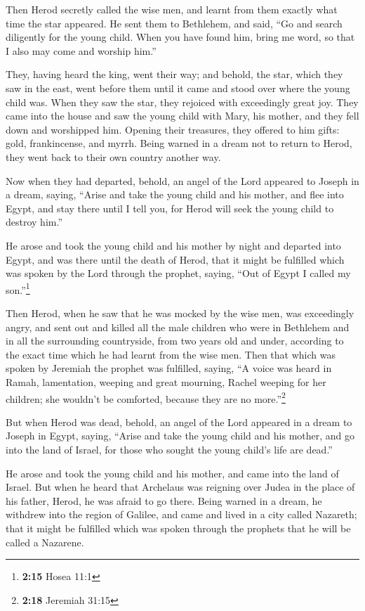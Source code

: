  Then Herod secretly called the wise men, and learnt from
them exactly what time the star appeared.  He sent them to
Bethlehem, and said, ``Go and search diligently for the young child.
When you have found him, bring me word, so that I also may come and
worship him.''

 They, having heard the king, went their way; and behold,
the star, which they saw in the east, went before them until it came and
stood over where the young child was.  When they saw the
star, they rejoiced with exceedingly great joy.  They
came into the house and saw the young child with Mary, his mother, and
they fell down and worshipped him. Opening their treasures, they offered
to him gifts: gold, frankincense, and myrrh.  Being
warned in a dream not to return to Herod, they went back to their own
country another way.

 Now when they had departed, behold, an angel of the Lord
appeared to Joseph in a dream, saying, ``Arise and take the young child
and his mother, and flee into Egypt, and stay there until I tell you,
for Herod will seek the young child to destroy him.''

 He arose and took the young child and his mother by
night and departed into Egypt,  and was there until the
death of Herod, that it might be fulfilled which was spoken by the Lord
through the prophet, saying, ``Out of Egypt I called my
son.''\footnote{\textbf{2:15} Hosea 11:1}

 Then Herod, when he saw that he was mocked by the wise
men, was exceedingly angry, and sent out and killed all the male
children who were in Bethlehem and in all the surrounding countryside,
from two years old and under, according to the exact time which he had
learnt from the wise men.  Then that which was spoken by
Jeremiah the prophet was fulfilled, saying,  ``A voice
was heard in Ramah, lamentation, weeping and great mourning, Rachel
weeping for her children; she wouldn't be comforted, because they are no
more.''\footnote{\textbf{2:18} Jeremiah 31:15}

 But when Herod was dead, behold, an angel of the Lord
appeared in a dream to Joseph in Egypt, saying,  ``Arise
and take the young child and his mother, and go into the land of Israel,
for those who sought the young child's life are dead.''

 He arose and took the young child and his mother, and
came into the land of Israel.  But when he heard that
Archelaus was reigning over Judea in the place of his father, Herod, he
was afraid to go there. Being warned in a dream, he withdrew into the
region of Galilee,  and came and lived in a city called
Nazareth; that it might be fulfilled which was spoken through the
prophets that he will be called a Nazarene.

